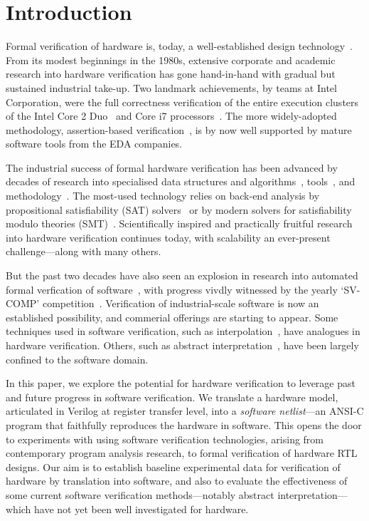 \section{Introduction}\label{sec:intro}
%
Formal verification of hardware is, today, a well-established design technology~\cite{Seligman:2015:FV}. From its modest beginnings in the 1980s, extensive corporate and academic research into hardware verification has gone hand-in-hand with gradual but sustained industrial take-up. Two landmark achievements, by teams at Intel Corporation, were the full correctness verification of the entire execution clusters of the Intel Core 2 Duo~\cite{Core2} and Core i7 processors~\cite{i7}. The more widely-adopted methodology,
assertion-based verification~\cite{Foster:2009:AAB}, is by now well supported by mature software tools from the EDA companies.

The industrial success of formal hardware verification has been advanced by decades of research into specialised data structures and algorithms~\cite{vis}, tools~\cite{Seger:2005:IEE,abc}, and methodology~\cite{MCMILLAN2000279,Aagaard:2000:MLH}. The most-used technology relies on back-end analysis by propositional satisfiability (SAT) solvers~\cite{Biere1999} or by modern solvers for satisfiability modulo theories (SMT)~\cite{decision_procedures, DBLP:conf/lpar/AndrausLS08,soc-keating,
DBLP:conf/mtv/SunkariCVM07,DBLP:conf/cav/Bjesse08}. Scientifically inspired and practically fruitful research into hardware verification continues today, with scalability an ever-present challenge---along with many others. 

But the past two decades have also seen an explosion in research into automated formal verfication of software~\cite{dkw2008}, with progress vivdly witnessed by the yearly `SV-COMP' competition~\cite{Beyer2017}.  Verification of industrial-scale software is now an established possibility, and commerial offerings are starting to appear. Some techniques used in software verification, such as interpolation~\cite{}, have analogues in hardware verification. Others, such as abstract interpretation~\cite{}, have been largely confined to the software domain.  

In this paper, we explore the potential for hardware verification to leverage past and future progress in software verification. We translate a hardware model, articulated in Verilog at register transfer level, into 
a \emph{software netlist}---an ANSI-C program that faithfully reproduces the hardware in software. This opens the door to experiments with using software verification technologies, arising from contemporary program analysis research, to formal verification of hardware RTL designs. Our aim is to establish baseline experimental data for verification of hardware by translation into software, and also to evaluate the effectiveness of some current software verification methods---notably abstract interpretation---which have not yet been well investigated for hardware.


